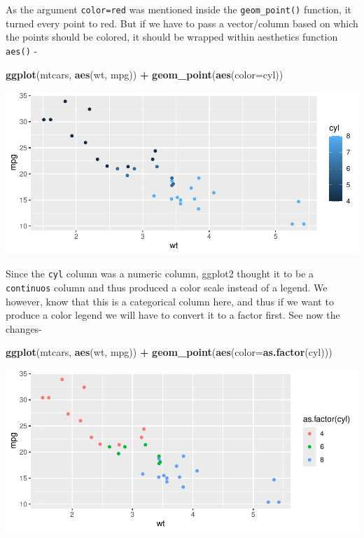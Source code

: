 \documentclass[
]{book}
\newenvironment{Shaded}{\begin{snugshade}}{\end{snugshade}}
\newcommand{\AttributeTok}[1]{\textcolor[rgb]{0.13,0.29,0.53}{#1}}
\newcommand{\FunctionTok}[1]{\textcolor[rgb]{0.13,0.29,0.53}{\textbf{#1}}}
\newcommand{\NormalTok}[1]{#1}
\newcommand{\SpecialCharTok}[1]{\textcolor[rgb]{0.81,0.36,0.00}{\textbf{#1}}}
\begin{document}
As the argument \texttt{color=\textquotesingle{}red\textquotesingle{}} was mentioned inside the \texttt{geom\_point()} function, it turned every point to red. But if we have to pass a vector/column based on which the points should be colored, it should be wrapped within aesthetics function \texttt{aes()} -

\begin{Shaded}
\begin{Highlighting}[]
\FunctionTok{ggplot}\NormalTok{(mtcars, }\FunctionTok{aes}\NormalTok{(wt, mpg)) }\SpecialCharTok{+}
  \FunctionTok{geom\_point}\NormalTok{(}\FunctionTok{aes}\NormalTok{(}\AttributeTok{color=}\NormalTok{cyl))}
\end{Highlighting}
\end{Shaded}

\begin{center}\includegraphics{DauR_files/figure-latex/fig_6-1} \end{center}

Since the \texttt{cyl} column was a numeric column, ggplot2 thought it to be a \texttt{continuos} column and thus produced a color scale instead of a legend. We however, know that this is a categorical column here, and thus if we want to produce a color legend we will have to convert it to a factor first. See now the changes-

\begin{Shaded}
\begin{Highlighting}[]
\FunctionTok{ggplot}\NormalTok{(mtcars, }\FunctionTok{aes}\NormalTok{(wt, mpg)) }\SpecialCharTok{+}
  \FunctionTok{geom\_point}\NormalTok{(}\FunctionTok{aes}\NormalTok{(}\AttributeTok{color=}\FunctionTok{as.factor}\NormalTok{(cyl)))}
\end{Highlighting}
\end{Shaded}

\begin{center}\includegraphics{DauR_files/figure-latex/fig_7-1} \end{center}
\end{document}
